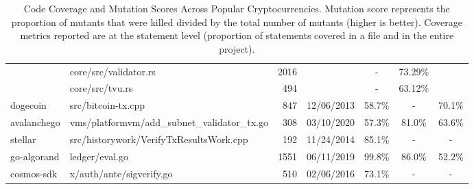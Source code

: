 \begin{table}[ht!]
\begin{tabular}{llrcccc}
                                & core/src/validator.rs                         & 2016            &                          & -                       & 73.29\%                 &                                         \\ 
                                & core/src/tvu.rs                               &  494            &                          & -                       & 63.12\%                 &                                         \\
\cmidrule{2-7}
dogecoin                        & src/bitcoin-tx.cpp                            & 847             & 12/06/2013               & 58.7\%                  & -                       & 70.1\%                                   \\
\cmidrule{2-7}
avalanchego                     & vms/platformvm/add\_subnet\_validator\_tx.go  & 308             & 03/10/2020               & 57.3\%                  & 81.0\%                  & 63.6\%                                   \\
\cmidrule{2-7}
  stellar                       & src/historywork/VerifyTxResultsWork.cpp       & 192             & 11/24/2014               & 85.1\%                  & -                       & -                                        \\
\cmidrule{2-7}
go-algorand                     & ledger/eval.go                                & 1551            & 06/11/2019               & 99.8\%                  & 86.0\%                  & 52.2\%                                    \\
\cmidrule{2-7}
cosmos-sdk                      & x/auth/ante/sigverify.go                      & 510             & 02/06/2016               & 73.1\%                  & -                       &  -                                       \\
\bottomrule
\end{tabular}
\caption{Code Coverage and Mutation Scores Across Popular Cryptocurrencies. Mutation score represents the proportion of mutants that were killed divided by the total number of mutants (higher is better). Coverage
metrics reported are at the statement level (proportion of statements covered in a file and in the entire project).}
\label{tab:comparison}
\end{table}

